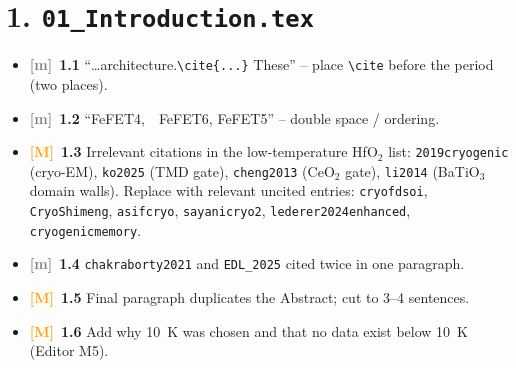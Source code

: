 \documentclass[10pt,a4paper]{article}
\newcommand{\M}{\textcolor{orange}{\textbf{[M]}}}
\newcommand{\m}{\textcolor{gray}{\textbf{[m]}}}
\begin{document}
\section*{1. \texttt{01\_Introduction.tex}}
\begin{itemize}
\item \m\ \textbf{1.1} ``\ldots architecture.\verb|\cite{...}| These'' -- place \verb|\cite| before the period (two places).
\item \m\ \textbf{1.2} ``FeFET4,\ \ FeFET6, FeFET5'' -- double space / ordering.
\item \M\ \textbf{1.3} Irrelevant citations in the low-temperature HfO$_2$ list: \texttt{2019cryogenic} (cryo-EM), \texttt{ko2025} (TMD gate), \texttt{cheng2013} (CeO$_2$ gate), \texttt{li2014} (BaTiO$_3$ domain walls). Replace with relevant uncited entries: \texttt{cryofdsoi}, \texttt{CryoShimeng}, \texttt{asifcryo}, \texttt{sayanicryo2}, \texttt{lederer2024enhanced}, \texttt{cryogenicmemory}.
\item \m\ \textbf{1.4} \texttt{chakraborty2021} and \texttt{EDL\_2025} cited twice in one paragraph.
\item \M\ \textbf{1.5} Final paragraph duplicates the Abstract; cut to 3--4 sentences.
\item \M\ \textbf{1.6} Add why 10~K was chosen and that no data exist below 10~K (Editor M5).
\end{itemize}

\end{document}
